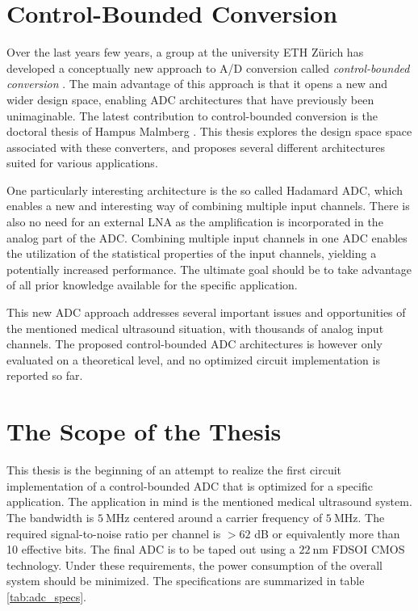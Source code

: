 \section{Control-Bounded Conversion}
Over the last years few years, a group at the university ETH Zürich has developed a conceptually new approach to A/D conversion called \textit{control-bounded conversion} \cite{cbc_2020_loeliger}. The main advantage of this approach is that it opens a new and wider design space, enabling ADC architectures that have previously been unimaginable. The latest contribution to control-bounded conversion is the doctoral thesis of Hampus Malmberg \cite{malmberg_thesis}. This thesis explores the design space space associated with these converters, and proposes several different architectures suited for various applications.

One particularly interesting architecture is the so called Hadamard ADC, which enables a new and interesting way of combining multiple input channels. There is also no need for an external LNA as the amplification is incorporated in the analog part of the ADC. Combining multiple input channels in one ADC enables the utilization of the statistical properties of the input channels, yielding a potentially increased performance. The ultimate goal should be to take advantage of all prior knowledge available for the specific application.

This new ADC approach addresses several important issues and opportunities of the mentioned medical ultrasound situation, with thousands of analog input channels. The proposed control-bounded ADC architectures is however only evaluated on a theoretical level, and no optimized circuit implementation is reported so far.

\section{The Scope of the Thesis}
This thesis is the beginning of an attempt to realize the first circuit implementation of a control-bounded ADC that is optimized for a specific application. The application in mind is the mentioned medical ultrasound system. The bandwidth is $\SI{5}{\mega\hertz}$ centered around a carrier frequency of $\SI{5}{\mega\hertz}$. The required signal-to-noise ratio per channel is $> 62$ dB or equivalently more than 10 effective bits. The final ADC is to be taped out using a $\SI{22}{\nano\metre}$ FDSOI CMOS technology. Under these requirements, the power consumption of the overall system should be minimized. The specifications are summarized in table \ref{tab:adc_specs}.

